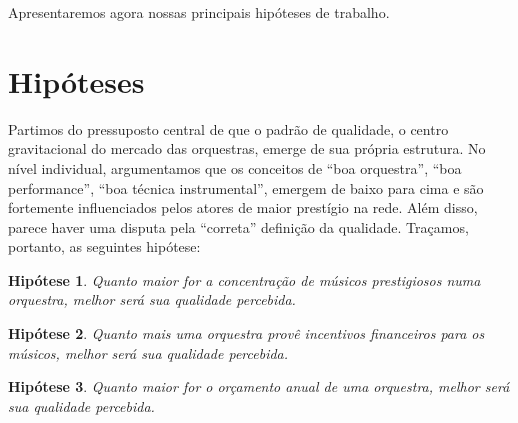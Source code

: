 \documentclass[a4paper, 12pt, openright, oneside, german, french, english, brazil]{abntex2}
\begin{document}
	Apresentaremos agora nossas principais hipóteses de trabalho.
	
	\section{Hipóteses}\label{hipoteses}
	
	\newtheorem{hip}{Hipótese}

	
	Partimos do pressuposto central de que o padrão de qualidade, o centro gravitacional do mercado das orquestras, emerge de sua própria estrutura. No nível individual, argumentamos que os conceitos de ``boa orquestra'', ``boa performance'', ``boa técnica instrumental'', emergem de baixo para cima e são fortemente influenciados pelos atores de maior prestígio na rede. Além disso, parece haver uma disputa pela ``correta'' definição da qualidade. Traçamos, portanto, as seguintes hipótese:
	
	
	\begin{hip}\label{hip:musprest}
		Quanto maior for a concentração de músicos prestigiosos numa orquestra, melhor será sua qualidade percebida.
	\end{hip}
	

	
	\begin{hip}\label{hip:incentivos}
		Quanto mais uma orquestra provê incentivos financeiros para os músicos, melhor será sua qualidade percebida.
	\end{hip}
	
	\begin{hip}\label{hip:orcamento}
		Quanto maior for o orçamento anual de uma orquestra, melhor será sua qualidade percebida.
	\end{hip}
	
	
\end{document}
